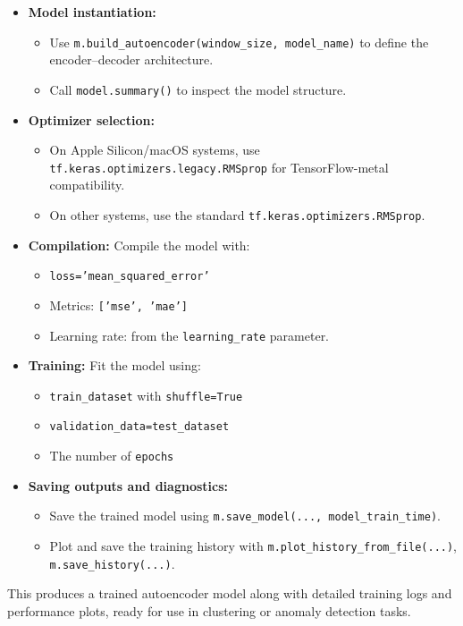 \documentclass[11pt]{article}
\begin{document}
\begin{itemize}
  \item \textbf{Model instantiation:} 
    \begin{itemize}
      \item Use \texttt{m.build\_autoencoder(window\_size, model\_name)} to define the encoder–decoder architecture.
      \item Call \texttt{model.summary()} to inspect the model structure.
    \end{itemize}
  \item \textbf{Optimizer selection:}
    \begin{itemize}
      \item On Apple Silicon/macOS systems, use \texttt{tf.keras.optimizers.legacy.RMSprop} for TensorFlow-metal compatibility.
      \item On other systems, use the standard \texttt{tf.keras.optimizers.RMSprop}.
    \end{itemize}
  \item \textbf{Compilation:} Compile the model with:
    \begin{itemize}
      \item \texttt{loss='mean\_squared\_error'}
      \item Metrics: \texttt{['mse', 'mae']}
      \item Learning rate: from the \texttt{learning\_rate} parameter.
    \end{itemize}
  \item \textbf{Training:} Fit the model using:
    \begin{itemize}
      \item \texttt{train\_dataset} with \texttt{shuffle=True}
      \item \texttt{validation\_data=test\_dataset}
      \item The number of \texttt{epochs}
    \end{itemize}
  \item \textbf{Saving outputs and diagnostics:}
    \begin{itemize}
      \item Save the trained model using \texttt{m.save\_model(..., model\_train\_time)}.
      \item Plot and save the training history with \texttt{m.plot\_history\_from\_file(...)}, \texttt{m.save\_history(...)}.
    \end{itemize}
\end{itemize}

This produces a trained autoencoder model along with detailed training logs and performance plots, ready for use in clustering or anomaly detection tasks.
\end{document}
